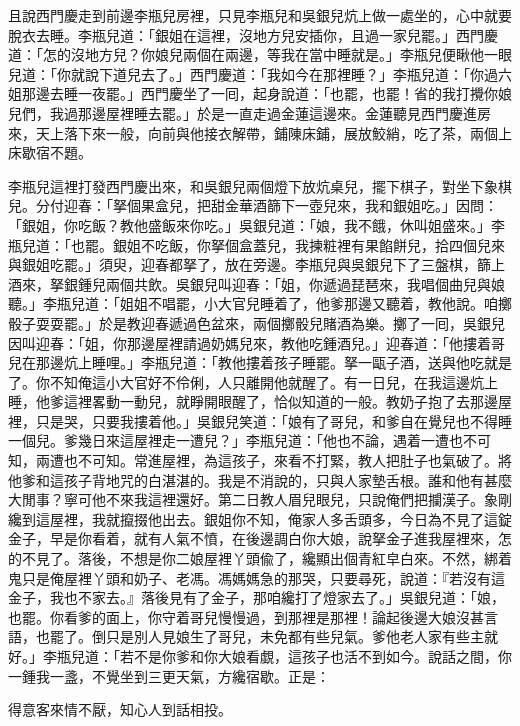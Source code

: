 且說西門慶走到前邊李瓶兒房裡，只見李瓶兒和吳銀兒炕上做一處坐的，心中就要脫衣去睡。李瓶兒道：「銀姐在這裡，沒地方兒安插你，且過一家兒罷。」西門慶道：「怎的沒地方兒？你娘兒兩個在兩邊，等我在當中睡就是。」李瓶兒便瞅他一眼兒道：「你就說下道兒去了。」西門慶道：「我如今在那裡睡？」李瓶兒道：「你過六姐那邊去睡一夜罷。」西門慶坐了一囘，起身說道：「也罷，也罷！省的我打攪你娘兒們，我過那邊屋裡睡去罷。」於是一直走過金蓮這邊來。金蓮聽見西門慶進房來，天上落下來一般，向前與他接衣解帶，鋪陳床鋪，展放鮫綃，吃了茶，兩個上床歇宿不題。

李瓶兒這裡打發西門慶出來，和吳銀兒兩個燈下放炕桌兒，擺下棋子，對坐下象棋兒。分付迎春：「拏個果盒兒，把甜金華酒篩下一壺兒來，我和銀姐吃。」因問：「銀姐，你吃飯？教他盛飯來你吃。」吳銀兒道：「娘，我不餓，休叫姐盛來。」李瓶兒道：「也罷。銀姐不吃飯，你拏個盒蓋兒，我揀粧裡有果餡餅兒，拾四個兒來與銀姐吃罷。」須臾，迎春都拏了，放在旁邊。李瓶兒與吳銀兒下了三盤棋，篩上酒來，拏銀鍾兒兩個共飲。吳銀兒叫迎春：「姐，你遞過琵琶來，我唱個曲兒與娘聽。」李瓶兒道：「姐姐不唱罷，小大官兒睡着了，他爹那邊又聽着，教他說。咱擲骰子耍耍罷。」於是教迎春遞過色盆來，兩個擲骰兒賭酒為樂。擲了一囘，吳銀兒因叫迎春：「姐，你那邊屋裡請過奶媽兒來，教他吃鍾酒兒。」迎春道：「他摟着哥兒在那邊炕上睡哩。」李瓶兒道：「教他摟着孩子睡罷。拏一甌子酒，送與他吃就是了。你不知俺這小大官好不伶俐，人只離開他就醒了。有一日兒，在我這邊炕上睡，他爹這裡畧動一動兒，就睜開眼醒了，恰似知道的一般。教奶子抱了去那邊屋裡，只是哭，只要我摟着他。」吳銀兒笑道：「娘有了哥兒，和爹自在覺兒也不得睡一個兒。爹幾日來這屋裡走一遭兒？」李瓶兒道：「他也不論，遇着一遭也不可知，兩遭也不可知。常進屋裡，為這孩子，來看不打緊，教人把肚子也氣破了。將他爹和這孩子背地咒的白湛湛的。我是不消說的，只與人家墊舌根。誰和他有甚麼大閒事？寧可他不來我這裡還好。第二日教人眉兒眼兒，只說俺們把攔漢子。象剛纔到這屋裡，我就攛掇他出去。銀姐你不知，俺家人多舌頭多，今日為不見了這錠金子，早是你看着，就有人氣不憤，在後邊調白你大娘，說拏金子進我屋裡來，怎的不見了。落後，不想是你二娘屋裡丫頭偸了，纔顯出個青紅皁白來。不然，綁着鬼只是俺屋裡丫頭和奶子、老馮。馮媽媽急的那哭，只要尋死，說道：『若沒有這金子，我也不家去。』落後見有了金子，那咱纔打了燈家去了。」吳銀兒道：「娘，也罷。你看爹的面上，你守着哥兒慢慢過，到那裡是那裡！論起後邊大娘沒甚言語，也罷了。倒只是別人見娘生了哥兒，未免都有些兒氣。爹他老人家有些主就好。」李瓶兒道：「若不是你爹和你大娘看覷，這孩子也活不到如今。說話之間，你一鍾我一盞，不覺坐到三更天氣，方纔宿歇。正是：

\begin{myquote}
得意客來情不厭，知心人到話相投。
\end{myquote}

